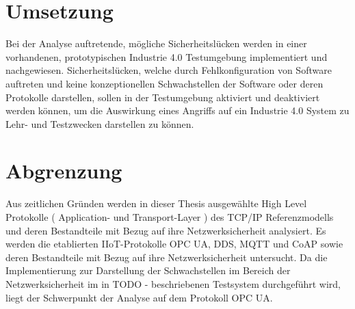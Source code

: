 \section{Umsetzung}
Bei der Analyse auftretende, mögliche Sicherheitslücken werden in einer vorhandenen, prototypischen Industrie 4.0 Testumgebung \cite{Weber2018} implementiert und nachgewiesen. Sicherheitslücken, welche durch Fehlkonfiguration von Software auftreten und keine konzeptionellen Schwachstellen der Software oder deren Protokolle darstellen, sollen in der Testumgebung aktiviert und deaktiviert werden können, um die Auswirkung eines Angriffs auf ein Industrie 4.0 System zu Lehr- und Testzwecken darstellen zu können.

\section{Abgrenzung}
Aus zeitlichen Gründen werden in dieser Thesis ausgewählte High Level Protokolle ( Application- und Transport-Layer ) des TCP/IP Referenzmodells und deren Bestandteile mit Bezug auf ihre Netzwerksicherheit analysiert. Es werden die etablierten \ac{IIoT}-Protokolle OPC UA, DDS, MQTT und CoAP sowie deren Bestandteile mit Bezug auf ihre Netzwerksicherheit untersucht. Da die Implementierung zur Darstellung der Schwachstellen im Bereich der Netzwerksicherheit im in TODO - beschriebenen Testsystem durchgeführt wird, liegt der Schwerpunkt der Analyse auf dem Protokoll OPC UA.